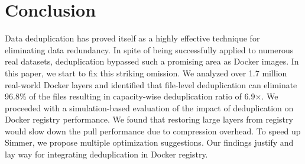 \section{Conclusion}
\label{sec:conclusion}

Data deduplication has proved itself as a highly effective technique for
eliminating data redundancy.
%
In spite of being successfully applied to numerous real datasets, deduplication
bypassed such a promising area as Docker images.
%
In this paper, we start to fix this striking omission.
%
We analyzed over 1.7 million real-world Docker layers and identified that
file-level deduplication can eliminate 96.8\% of the files resulting in
capacity-wise deduplication ratio of 6.9$\times$.
%
We proceeded with a simulation-based evaluation of the impact of deduplication
on Docker registry performance.
%
We found that restoring large layers from registry would slow down the pull performance due to compression overhead. To speed up Simmer, we propose multiple optimization suggestions.
%
%
Our findings justify and lay way for integrating deduplication in Docker
registry.


